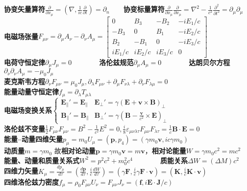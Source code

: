 \documentclass[10pt,a4paper]{article}
\begin{document}
\begin{multicols}{2}
\textbf{协变矢量算符}$\frac{\partial}{\partial x_{\mu}}=(\nabla,\frac{1}{ic}\frac{\partial}{\partial t})=\partial_n$~~~~\textbf{协变标量算符}$\frac{\partial}{\partial x_{\mu}}\frac{\partial}{\partial x_{\mu}}=\nabla^2-\frac{1}{c^2}\frac{\partial^2}{\partial t^2}=\partial_{\mu}\partial_{\mu}$\\
\textbf{电磁场张量}$F_{\mu\nu}=\partial_{\mu}A_{\nu}-\partial_{\nu}A_{\mu}=\left[\begin{array}{cccc}0&B_3&-B_2&-iE_1/c\\-B_3&0&B_1&-iE_2/c\\B_2&-B_1&0&-iE_3/c\\iE_1/c&iE_2/c&iE_3/c&0\end{array}\right]$\\
\textbf{电荷守恒定律}$\partial_{\mu}J_{\mu}=0$~~~~~~~~\textbf{洛伦兹规范}$\partial_{\mu}A_{\mu}=0$~~~~~~~~\textbf{达朗贝尔方程}$\partial_{\nu}\partial_{\nu}A_{\mu}=-\mu_0J_{\mu}$\\
\textbf{麦克斯韦方程}$\partial_{\nu}F_{\mu\nu}=\mu_0J_{\mu},\partial_{\lambda}F_{\mu\nu}+\partial_{\mu}F_{\nu\lambda}+\partial_{\nu}F_{\lambda\mu}=0$\\
\textbf{能量动量守恒定律}$f_{\mu}=\partial_{\lambda}T_{\mu\lambda}$\\
\textbf{电磁场变换关系}$\left\{\begin{array}{ll}\bm{E}_{\parallel}'=\bm{E}_{\parallel}&\bm{E}_{\perp}'=\gamma(\bm{E}+\bm{v}\times\bm{B})_{\perp}\\\bm{B}_{\parallel}'=\bm{B}_{\parallel}&\bm{B}_{\perp}'=\gamma(\bm{B}-\frac{\bm{v}}{c^2}\times\bm{E})_{\perp}\end{array}\right.$\\
\textbf{洛伦兹不变量}$\frac{1}{2}F_{\mu\nu}F_{\mu\nu}=B^2-\frac{1}{c^2}E^2=0,\frac{i}{8}\varepsilon_{\mu\nu\lambda\tau}F_{\mu\nu}F_{\lambda\tau}=\frac{1}{c}\bm{B}\cdot\bm{E}=0$\\
\textbf{能量--动量四维矢量}$p_{\mu}=m_0U_{\mu}=(\bm{p},p_4)=(\gamma m_0\bm{v},ic\gamma m_0)$\\
\textbf{动质量}$m=\gamma m_0$ 故\textbf{相对论动量}$\bm{p}=\gamma m_0\bm{v}=m\bm{v}$，\textbf{相对论能量}$W=\gamma m_0c^2=mc^2$\\
\textbf{能量、动量和质量关系式}$W^2=p^2c^2+m_0^2c^4$~~~~~~~~\textbf{质能关系}$\Delta W=(\Delta M)c^2$\\
\textbf{四维力矢量}$K_{\mu}=\frac{dp_{\mu}}{d\tau}=(\frac{d\bm{p}}{d\tau},\frac{i}{c}\frac{dW}{d\tau})=(\gamma\bm{F},\frac{i}{c}\gamma\bm{F}\cdot\bm{v})=(\bm{K},\frac{i}{c}\bm{K}\cdot\bm{v})$\\
\textbf{四维洛伦兹力密度}$f_{\mu}=\rho_0F_{\mu\nu}U_{\nu}=F_{\mu\nu}J_{\nu}=(\bm{f},i\bm{E}\cdot\bm{J}/c)$
\end{multicols}
\end{document}
